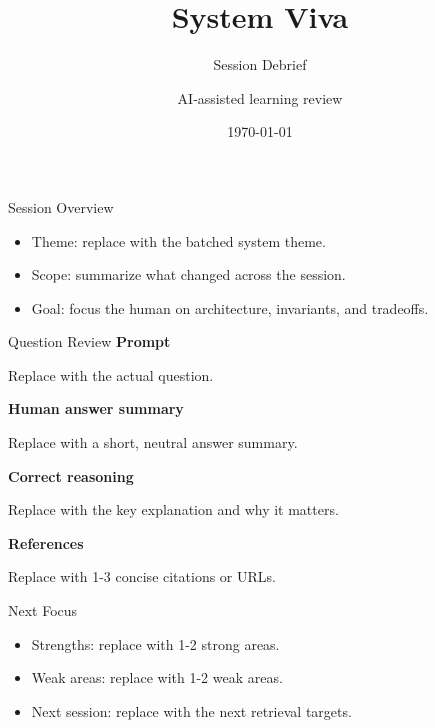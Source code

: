 \documentclass[aspectratio=169]{beamer}
\title{System Viva}
\subtitle{Session Debrief}
\author{AI-assisted learning review}
\date{\today}
\begin{document}
\begin{frame}[plain]
  \titlepage
\end{frame}

\begin{frame}{Session Overview}
  \begin{itemize}
    \item Theme: replace with the batched system theme.
    \item Scope: summarize what changed across the session.
    \item Goal: focus the human on architecture, invariants, and tradeoffs.
  \end{itemize}
\end{frame}

\begin{frame}{Question Review}
  \textbf{Prompt}

  Replace with the actual question.

  \vspace{0.5em}
  \textbf{Human answer summary}

  Replace with a short, neutral answer summary.

  \vspace{0.5em}
  \textbf{Correct reasoning}

  Replace with the key explanation and why it matters.

  \vspace{0.5em}
  \textbf{References}

  Replace with 1-3 concise citations or URLs.
\end{frame}

\begin{frame}{Next Focus}
  \begin{itemize}
    \item Strengths: replace with 1-2 strong areas.
    \item Weak areas: replace with 1-2 weak areas.
    \item Next session: replace with the next retrieval targets.
  \end{itemize}
\end{frame}
\end{document}
